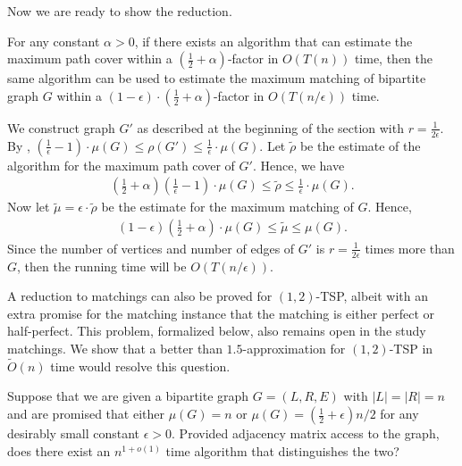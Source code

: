 Now we are ready to show the reduction.

\begin{lemma}
For any constant $\alpha > 0$, if there exists an algorithm that can estimate the maximum path cover within a $(\frac{1}{2} + \alpha)$-factor in $O(T(n))$ time, then the same algorithm can be used to estimate the maximum matching of bipartite graph $G$ within a $(1 - \epsilon)\cdot (\frac{1}{2} + \alpha)$-factor in $O(T(n/\epsilon))$ time.
\end{lemma}
\begin{myproof}
We construct graph $G'$ as described at the beginning of the section with $r = \frac{1}{2\epsilon}$. By , $(\frac{1}{\epsilon}-1)\cdot\mu(G) \leq \rho(G') \leq \frac{1}{\epsilon}\cdot \mu(G)$. Let $\tilde{\rho}$ be the estimate of the algorithm for the maximum path cover of $G'$. Hence, we have 
\begin{align*}
    (\frac{1}{2} + \alpha)(\frac{1}{\epsilon}-1)\cdot\mu(G) \leq \tilde{\rho} \leq \frac{1}{\epsilon}\cdot \mu(G).
\end{align*}
Now let $\tilde{\mu} = \epsilon\cdot\tilde{\rho}$ be the estimate for the maximum matching of $G$. Hence, 
\begin{align*}
    (1-\epsilon)(\frac{1}{2} + \alpha)\cdot\mu(G) \leq \tilde{\mu} \leq \mu(G).
\end{align*}
Since the number of vertices and number of edges of $G'$ is $r=\frac{1}{2\epsilon}$ times more than $G$, then the running time will be $O(T(n/\epsilon))$.
\end{myproof}


A reduction to matchings can also be proved for $(1,2)$-TSP, albeit with an extra promise for the matching instance that the matching is either perfect or half-perfect. This problem, formalized below, also remains open in the study matchings. We show that a better than $1.5$-approximation for $(1,2)$-TSP in $\widetilde{O}(n)$ time would resolve this question.

\begin{problem}\label{problem:matching-promised}
Suppose that we are given a bipartite graph $G=(L, R, E)$ with $|L| = |R| = n$ and are promised that either $\mu(G) = n$ or $\mu(G) = (\frac{1}{2}+\epsilon)n/2$ for any desirably small constant $\epsilon > 0$. Provided adjacency matrix access to the graph, does there exist an $n^{1+o(1)}$ time algorithm that distinguishes the two?
\end{problem}

